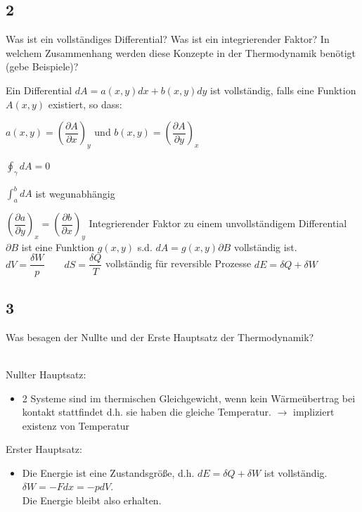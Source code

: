 \subsection{2}
\begin{myfrag}
Was ist ein vollständiges Differential? Was ist ein integrierender Faktor?
In welchem Zusammenhang werden diese Konzepte in der
Thermodynamik benötigt (gebe Beispiele)?
\end{myfrag} \qquad \newline
Ein Differential $dA = a(x,y)dx+b(x,y)dy$ ist vollständig, falls eine Funktion $A(x,y)$ existiert, so dass:
\begin{compactenum}[(i)]
\item $a(x,y) = \left(\dfrac{\partial A}{\partial x} \right) _y $ und $b(x,y) = \left( \dfrac{\partial A}{\partial y} \right) _x $
\item $\oint_\gamma dA = 0 $
\item $\int_a^b dA $ ist wegunabhängig
\item $\left(\dfrac{\partial a}{\partial y} \right) _x = \left(\dfrac{\partial b}{\partial x} \right) _y $
Integrierender Faktor zu einem unvollständigem Differential $\partial B$ ist eine Funktion $g(x,y)$ s.d. $dA = g(x,y)\partial B $ vollständig ist. \newline
$ dV = \dfrac{\delta W}{p} \qquad dS = \dfrac{\delta Q}{T}$ \quad vollständig für reversible Prozesse 
$ dE = \delta Q + \delta W$
\end{compactenum}
\subsection{3}
\begin{myfrag}
Was besagen der Nullte und der Erste Hauptsatz der Thermodynamik?
\end{myfrag} \quad \\
Nullter Hauptsatz:
\begin{itemize}
\item 2 Systeme sind im thermischen Gleichgewicht, wenn kein Wärmeübertrag bei kontakt stattfindet d.h. sie haben die gleiche Temperatur.
$\rightarrow$ impliziert existenz von Temperatur
\end{itemize}
Erster Hauptsatz:
\begin{itemize}
\item Die Energie ist eine Zustandsgröße, d.h. $dE= \delta Q + \delta W $ ist vollständig. $ \delta W = -Fdx = -pdV$.\\
Die Energie bleibt also erhalten.
\end{itemize}
